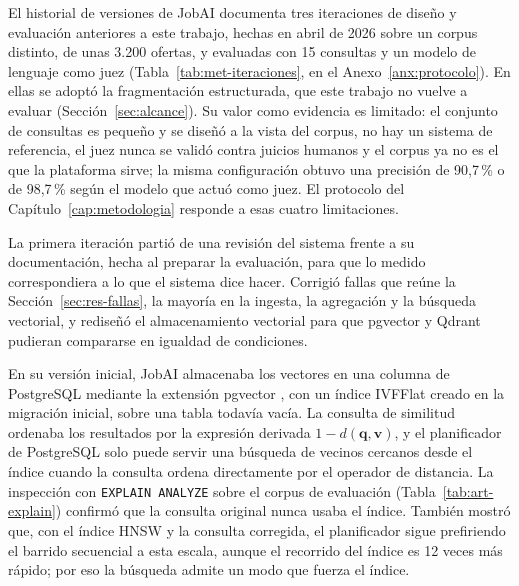 \label{sec:art-antecedentes}El historial de versiones de JobAI documenta tres iteraciones de diseño y evaluación anteriores a este trabajo, hechas en abril de 2026 sobre un corpus distinto, de unas 3.200 ofertas, y evaluadas con 15 consultas y un modelo de lenguaje como juez (Tabla~\ref{tab:met-iteraciones}, en el Anexo~\ref{anx:protocolo}). En ellas se adoptó la fragmentación estructurada, que este trabajo no vuelve a evaluar (Sección~\ref{sec:alcance}). Su valor como evidencia es limitado: el conjunto de consultas es pequeño y se diseñó a la vista del corpus, no hay un sistema de referencia, el juez nunca se validó contra juicios humanos y el corpus ya no es el que la plataforma sirve; la misma configuración obtuvo una precisión de 90,7\,\% o de 98,7\,\% según el modelo que actuó como juez. El protocolo del Capítulo~\ref{cap:metodologia} responde a esas cuatro limitaciones.

La primera iteración partió de una revisión del sistema frente a su documentación, hecha al preparar la evaluación, para que lo medido correspondiera a lo que el sistema dice hacer. Corrigió fallas que reúne la Sección~\ref{sec:res-fallas}, la mayoría en la ingesta, la agregación y la búsqueda vectorial, y rediseñó el almacenamiento vectorial para que pgvector y Qdrant pudieran compararse en igualdad de condiciones.

En su versión inicial, JobAI almacenaba los vectores en una columna de PostgreSQL mediante la extensión pgvector \citep{Pgvector}, con un índice IVFFlat creado en la migración inicial, sobre una tabla todavía vacía. La consulta de similitud ordenaba los resultados por la expresión derivada $1 - d(\mathbf{q}, \mathbf{v})$, y el planificador de PostgreSQL solo puede servir una búsqueda de vecinos cercanos desde el índice cuando la consulta ordena directamente por el operador de distancia. La inspección con \texttt{EXPLAIN ANALYZE} sobre el corpus de evaluación (Tabla~\ref{tab:art-explain}) confirmó que la consulta original nunca usaba el índice. También mostró que, con el índice HNSW y la consulta corregida, el planificador sigue prefiriendo el barrido secuencial a esta escala, aunque el recorrido del índice es 12 veces más rápido; por eso la búsqueda admite un modo que fuerza el índice.


